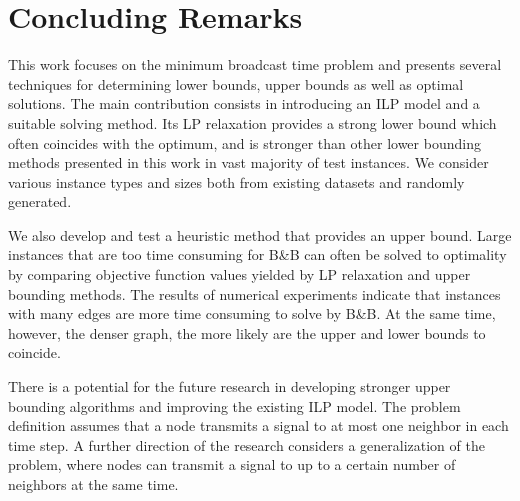 \section{Concluding Remarks} \label{sec:conc}

This work focuses on the minimum broadcast time problem and presents several techniques for determining lower bounds, upper bounds as well as optimal solutions.
The main contribution consists in introducing an ILP model and a suitable solving method.
Its LP relaxation provides a strong lower bound which often coincides with the optimum, and is stronger than other lower bounding methods presented in this work in vast majority of test instances.
We consider various instance types and sizes both from existing datasets and randomly generated.

We also develop and test a heuristic method that provides an upper bound. 
Large instances that are too time consuming for B\&B can often be solved to optimality by comparing objective function values yielded by LP relaxation and upper bounding methods.
The results of numerical experiments indicate that instances with many edges are more time consuming to solve by B\&B.
At the same time, however, the denser graph, the more likely are the upper and lower bounds to coincide. 

There is a potential for the future research in developing stronger upper bounding algorithms and improving the existing ILP model.
The problem definition assumes that a node transmits a signal to at most one neighbor in each time step.
A further direction of the research considers a generalization of the problem, where nodes can transmit a signal to up to a certain number of neighbors at the same time.

